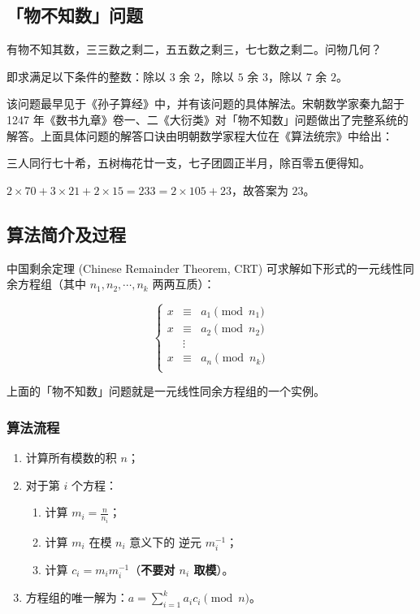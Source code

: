 
\subsection{「物不知数」问题}

\begin{QUOTE}{}{}
有物不知其数，三三数之剩二，五五数之剩三，七七数之剩二。问物几何？
\end{QUOTE}

即求满足以下条件的整数：除以 $3$ 余 $2$，除以 $5$ 余 $3$，除以 $7$ 余 $2$。

该问题最早见于《孙子算经》中，并有该问题的具体解法。宋朝数学家秦九韶于 1247 年《数书九章》卷一、二《大衍类》对「物不知数」问题做出了完整系统的解答。上面具体问题的解答口诀由明朝数学家程大位在《算法统宗》中给出：

\begin{QUOTE}{}{}
三人同行七十希，五树梅花廿一支，七子团圆正半月，除百零五便得知。
\end{QUOTE}

$2\times 70+3\times 21+2\times 15=233=2\times 105+23$，故答案为 $23$。

\subsection{算法简介及过程}

中国剩余定理 (Chinese Remainder Theorem, CRT) 可求解如下形式的一元线性同余方程组（其中 $n_1, n_2, \cdots, n_k$ 两两互质）：

$$
\left \{
\begin{array}{ccc}
x &\equiv& a_1 \pmod {n_1} \\
x &\equiv& a_2 \pmod {n_2} \\
  &\vdots& \\
x &\equiv& a_n \pmod {n_k} \\
\end{array}
\right.
$$

上面的「物不知数」问题就是一元线性同余方程组的一个实例。

\subsubsection{算法流程}

\begin{enumerate}
\item 计算所有模数的积 $n$；
\item 对于第 $i$ 个方程：
\begin{enumerate}
\item 计算 $m_i=\frac{n}{n_i}$；
\item 计算 $m_i$ 在模 $n_i$ 意义下的 逆元  $m_i^{-1}$；
\item 计算 $c_i=m_im_i^{-1}$（\textbf{不要对 $n_i$ 取模}）。
\end{enumerate}
\item 方程组的唯一解为：$a=\sum_{i=1}^k a_ic_i \pmod n$。
\end{enumerate}

